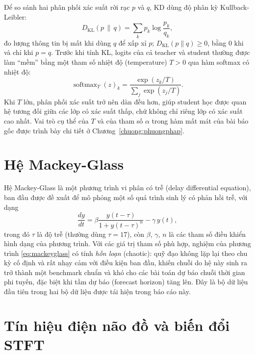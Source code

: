 Để so sánh hai phân phối xác suất rời rạc $p$ và $q$, KD dùng độ phân kỳ Kullback-Leibler:
\begin{equation}
	D_{\mathrm{KL}}(p \,\|\, q) = \sum_{k} p_k \log \frac{p_k}{q_k},
	\label{eq:kl}
\end{equation}
đo lượng thông tin bị mất khi dùng $q$ để xấp xỉ $p$; $D_{\mathrm{KL}}(p\|q) \geq 0$, bằng 0
khi và chỉ khi $p = q$. Trước khi tính KL, logits của cả teacher và student thường được làm
``mềm'' bằng một tham số nhiệt độ (temperature) $T > 0$ qua hàm softmax có nhiệt độ:
\begin{equation}
	\operatorname{softmax}_T(z)_k = \frac{\exp(z_k / T)}{\sum_j \exp(z_j / T)}.
	\label{eq:softmax-t}
\end{equation}
Khi $T$ lớn, phân phối xác suất trở nên dàn đều hơn, giúp student học được quan hệ tương đối
giữa các lớp có xác suất thấp, chứ không chỉ riêng lớp có xác suất cao nhất. Vai trò cụ thể
của $T$ và của tham số $\alpha$ trong hàm mất mát của bài báo gốc được trình bày chi tiết ở
Chương~\ref{chuong:phuongphap}.

\section{Hệ Mackey-Glass}
\label{sec:mackeyglass}

Hệ Mackey-Glass \cite{mackeyglass1977} là một phương trình vi phân có trễ (delay differential
equation), ban đầu được đề xuất để mô phỏng một số quá trình sinh lý có phản hồi trễ, với dạng
\begin{equation}
	\frac{dy}{dt} = \beta \frac{y(t-\tau)}{1 + y(t-\tau)^n} - \gamma\, y(t),
	\label{eq:mackeyglass}
\end{equation}
trong đó $\tau$ là độ trễ (thường dùng $\tau = 17$), còn $\beta$, $\gamma$, $n$ là các tham số
điều khiển hình dạng của phương trình. Với các giá trị tham số phù hợp, nghiệm của phương
trình \eqref{eq:mackeyglass} có tính \textit{hỗn loạn} (chaotic): quỹ đạo không lặp lại theo
chu kỳ cố định và rất nhạy cảm với điều kiện ban đầu, khiến chuỗi do hệ này sinh ra trở thành
một benchmark chuẩn và khó cho các bài toán dự báo chuỗi thời gian phi tuyến, đặc biệt khi tầm
dự báo (forecast horizon) tăng lên. Đây là bộ dữ liệu đầu tiên trong hai bộ dữ liệu được tái
hiện trong báo cáo này.

\section{Tín hiệu điện não đồ và biến đổi STFT}
\label{sec:eeg}

